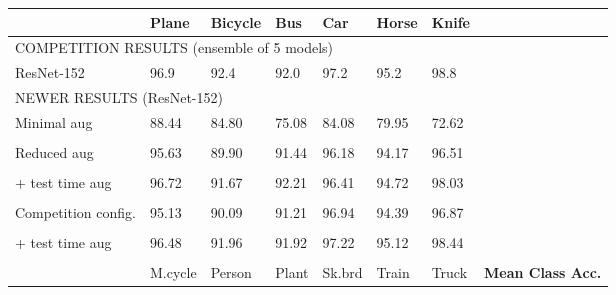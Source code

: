 \documentclass{article}
\begin{document}
\begin{table}[!t]
\begin{center}
\footnotesize
\begin{tabular}{llllllll}
\hline
\hline
{}                                       & Plane & Bicycle & Bus & Car & Horse & Knife & \\
\hline
\hline

\multicolumn{8}{l}{COMPETITION RESULTS (ensemble of 5 models)} \\

\rule{0pt}{2.5ex}ResNet-152       & 96.9      & 92.4      & 92.0      & 97.2      & 95.2      & 98.8 & \\

\hline

\multicolumn{8}{l}{NEWER RESULTS (ResNet-152)} \\

\rule{0pt}{2.5ex}Minimal aug        & 88.44     & 84.80     & 75.08     & 84.08     & 79.95     & 72.62     & \\
                                    &   &   &   &   &   &   & \\

\rule{0pt}{2.5ex}Reduced aug        & 95.63     & 89.90     & 91.44     & 96.18     & 94.17     & 96.51     & \\
                                    &   &   &   &   &   &   & \\

\rule{0pt}{2.5ex}+ test time aug    & 96.72     & 91.67     & 92.21     & 96.41     & 94.72     & 98.03     & \\
                                    &   &   &   &   &   &   & \\


\rule{0pt}{2.5ex}Competition config.& 95.13     & 90.09     & 91.21     & 96.94     & 94.39     & 96.87     & \\
                                    &   &   &   &   &   &   & \\

\rule{0pt}{2.5ex}+ test time aug    & 96.48     & 91.96     & 91.92     & 97.22     & 95.12     & 98.44     & \\
                                    &   &   &   &   &   &   & \\


\hline
\hline

\hline
\hline
{}                  & M.cycle     & Person    & Plant     & Sk.brd    & Train     & Truck     & \textbf{Mean Class Acc.} \\
\hline
\hline


\end{tabular}
\end{center}
\end{table}
\end{document}
